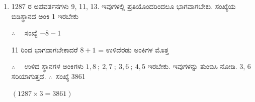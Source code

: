 \begin{enumerate}
\item 1287 ರ ಅಪವರ್ತನಗಳು 9, 11, 13. ಇವುಗಳಲ್ಲಿ ಪ್ರತಿಯೊಂದರಿಂದಲೂ ಭಾಗವಾಗಬೇಕು. ಸಂಖ್ಯೆಯ ಬಿಡಿಸ್ಥಾನದ ಅಂಕಿ 1 ಇರಬೇಕು 

$\therefore\quad$ ಸಂಖ್ಯೆ  $ - 8 - 1$

11 ರಿಂದ ಭಾಗವಾಗಬೇಕಾದರೆ $8 + 1$ = ಉಳಿದೆರಡು ಅಂಕಿಗಳ ಮೊತ್ತ 

$\therefore\quad$ ಉಳಿದ ಸ್ಥಾನಗಳ ಅಂಕಿಗಳು $1, 8 ~;~ 2, 7 ~;~ 3, 6 ~;~ 4, 5$ ಇರಬೇಕು. ಇವುಗಳನ್ನು ತುಂಬಿಸಿ ನೋಡಿ. 3, 6 ಸರಿಯಾಗುತ್ತದೆ. $\therefore~$ ಸಂಖ್ಯೆ 3861

$(1287\times 3 = 3861)$
\end{enumerate}
